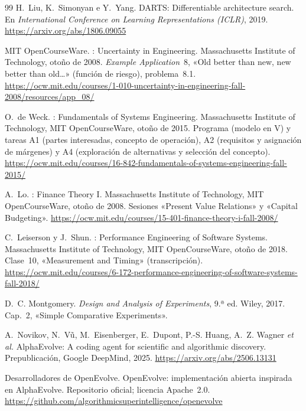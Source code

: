 \begin{thebibliography}{99}
H.~Liu, K.~Simonyan e Y.~Yang.
\newblock DARTS: Differentiable architecture search.
\newblock En \emph{International Conference on Learning Representations (ICLR)}, 2019.
\newblock \url{https://arxiv.org/abs/1806.09055}

MIT OpenCourseWare.
: Uncertainty in Engineering.
\newblock Massachusetts Institute of Technology, otoño de 2008. \emph{Example Application}~8, «Old better than new, new better than old\dots» (función de riesgo), problema~8.1.
\newblock \url{https://ocw.mit.edu/courses/1-010-uncertainty-in-engineering-fall-2008/resources/app_08/}

O.~de Weck.
: Fundamentals of Systems Engineering.
\newblock Massachusetts Institute of Technology, MIT OpenCourseWare, otoño de 2015. Programa (modelo en V) y tareas A1 (partes interesadas, concepto de operación), A2 (requisitos y asignación de márgenes) y A4 (exploración de alternativas y selección del concepto).
\newblock \url{https://ocw.mit.edu/courses/16-842-fundamentals-of-systems-engineering-fall-2015/}

A.~Lo.
: Finance Theory I.
\newblock Massachusetts Institute of Technology, MIT OpenCourseWare, otoño de 2008. Sesiones «Present Value Relations» y «Capital Budgeting».
\newblock \url{https://ocw.mit.edu/courses/15-401-finance-theory-i-fall-2008/}

C.~Leiserson y J.~Shun.
: Performance Engineering of Software Systems.
\newblock Massachusetts Institute of Technology, MIT OpenCourseWare, otoño de 2018. Clase~10, «Measurement and Timing» (transcripción).
\newblock \url{https://ocw.mit.edu/courses/6-172-performance-engineering-of-software-systems-fall-2018/}

D.~C. Montgomery.
\newblock \emph{Design and Analysis of Experiments}, 9.ª ed.
\newblock Wiley, 2017. Cap.~2, «Simple Comparative Experiments».

A.~Novikov, N.~V{\~u}, M.~Eisenberger, E.~Dupont, P.-S. Huang, A.~Z. Wagner \emph{et al.}
\newblock AlphaEvolve: A coding agent for scientific and algorithmic discovery.
\newblock Prepublicación, Google DeepMind, 2025.
\newblock \url{https://arxiv.org/abs/2506.13131}

Desarrolladores de OpenEvolve.
\newblock OpenEvolve: implementación abierta inspirada en AlphaEvolve. Repositorio oficial; licencia Apache~2.0.
\newblock \url{https://github.com/algorithmicsuperintelligence/openevolve}


\end{thebibliography}
